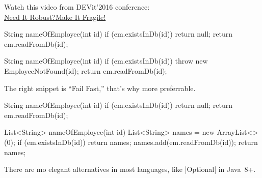 \documentclass{article}
\begin{document}
\par
{}
\par
Watch this video from DEVit'2016 conference: \\
\href{https://www.youtube.com/watch?v=nCGBgI1MNwE}{Need It Robust?Make It Fragile!}
\plush{}


\begin{pptWide}{2}
{\small\begin{ffcode}
String nameOfEmployee(int id) {
  if (em.existsInDb(id)) {
    return null;
  }
  return em.readFromDb(id);
}
\end{ffcode}
}
\par\columnbreak\par
{\small\begin{ffcode}
String nameOfEmployee(int id) {
  if (em.existsInDb(id)) {
    throw new EmployeeNotFound(id);
  }
  return em.readFromDb(id);
}
\end{ffcode}
}
\end{pptWide}
\par
The right snippet is ``Fail Fast,'' that's why more preferrable.
\plush{}

\begin{pptWide}{2}
{\small\begin{ffcode}
String nameOfEmployee(int id) {
  if (em.existsInDb(id)) {
    return null;
  }
  return em.readFromDb(id);
}
\end{ffcode}
}
\par\columnbreak\par
{\small\begin{ffcode}
List<String> nameOfEmployee(int id) {
  List<String> names =
    new ArrayList<>(0);
  if (em.existsInDb(id)) {
    return names;
  }
  names.add(em.readFromDb(id));
  return names;
}
\end{ffcode}
}
\end{pptWide}
\par
There are mo elegant alternatives in most languages, like |Optional| in Java~8+.
\plush{}
\end{document}

